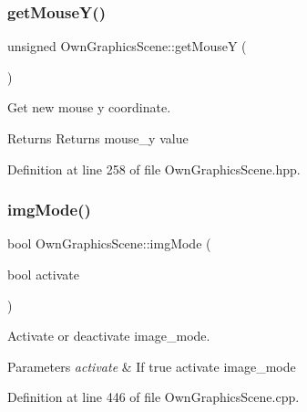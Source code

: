 \subsubsection{\texorpdfstring{get\+Mouse\+Y()}{getMouseY()}}
{\footnotesize\ttfamily unsigned Own\+Graphics\+Scene\+::get\+MouseY (\begin{DoxyParamCaption}{ }\end{DoxyParamCaption})\hspace{0.3cm}{\ttfamily [inline]}}



Get new mouse y coordinate. 

\begin{DoxyReturn}{Returns}
Returns mouse\+\_\+y value 
\end{DoxyReturn}


Definition at line 258 of file Own\+Graphics\+Scene.\+hpp.

\mbox{\label{classOwnGraphicsScene_acc6e7978a3f10889e439ceabd155a341}} 
\subsubsection{\texorpdfstring{img\+Mode()}{imgMode()}}
{\footnotesize\ttfamily bool Own\+Graphics\+Scene\+::img\+Mode (\begin{DoxyParamCaption}\item[{bool}]{activate }\end{DoxyParamCaption})}



Activate or deactivate image\+\_\+mode. 


\begin{DoxyParams}{Parameters}
{\em activate} & If true activate image\+\_\+mode \\
\hline
\end{DoxyParams}


Definition at line 446 of file Own\+Graphics\+Scene.\+cpp.

\mbox{\label{classOwnGraphicsScene_ab8e0992d026eaeeda434d659c9c18a46}} 
